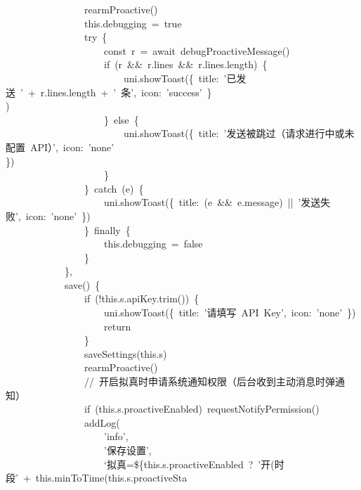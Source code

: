 \documentclass[a4paper,10pt]{article}
\begin{document}
{\ttfamily\footnotesize\raggedright
~~~~~~~~~~~~~~~~rearmProactive()\\
~~~~~~~~~~~~~~~~this.debugging~=~true\\
~~~~~~~~~~~~~~~~try~\{\\
~~~~~~~~~~~~~~~~~~~~const~r~=~await~debugProactiveMessage()\\
~~~~~~~~~~~~~~~~~~~~if~(r~\&\&~r.lines~\&\&~r.lines.length)~\{\\
~~~~~~~~~~~~~~~~~~~~~~~~uni.showToast(\{~title:~'已发送~'~+~r.lines.length~+~'~条',~icon:~'success'~\}\\
)\\
~~~~~~~~~~~~~~~~~~~~\}~else~\{\\
~~~~~~~~~~~~~~~~~~~~~~~~uni.showToast(\{~title:~'发送被跳过（请求进行中或未配置~API）',~icon:~'none'~\\
\})\\
~~~~~~~~~~~~~~~~~~~~\}\\
~~~~~~~~~~~~~~~~\}~catch~(e)~\{\\
~~~~~~~~~~~~~~~~~~~~uni.showToast(\{~title:~(e~\&\&~e.message)~||~'发送失败',~icon:~'none'~\})\\
~~~~~~~~~~~~~~~~\}~finally~\{\\
~~~~~~~~~~~~~~~~~~~~this.debugging~=~false\\
~~~~~~~~~~~~~~~~\}\\
~~~~~~~~~~~~\},\\
~~~~~~~~~~~~save()~\{\\
~~~~~~~~~~~~~~~~if~(!this.s.apiKey.trim())~\{\\
~~~~~~~~~~~~~~~~~~~~uni.showToast(\{~title:~'请填写~API~Key',~icon:~'none'~\})\\
~~~~~~~~~~~~~~~~~~~~return\\
~~~~~~~~~~~~~~~~\}\\
~~~~~~~~~~~~~~~~saveSettings(this.s)\\
~~~~~~~~~~~~~~~~rearmProactive()\\
~~~~~~~~~~~~~~~~//~开启拟真时申请系统通知权限（后台收到主动消息时弹通知）\\
~~~~~~~~~~~~~~~~if~(this.s.proactiveEnabled)~requestNotifyPermission()\\
~~~~~~~~~~~~~~~~addLog(\\
~~~~~~~~~~~~~~~~~~~~'info',\\
~~~~~~~~~~~~~~~~~~~~'保存设置',\\
~~~~~~~~~~~~~~~~~~~~`拟真=\$\{this.s.proactiveEnabled~?~'开(时段'~+~this.minToTime(this.s.proactiveSta\\
}
\end{document}
